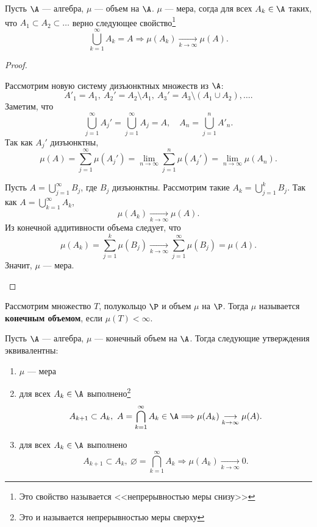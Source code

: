 \begin{thm}
    Пусть $ \A$ --- алгебра, $ \mu$ --- объем на $ \A$. $ \mu $ --- мера, согда
	для всех $ A_k \in \A$ таких, что $ A_1 \subset A_2 \subset  \ldots $ верно следующее свойство\footnote{Это свойство называется <<непрерывностью меры  снизу>>}
	\[
		\bigcup_{k=1}^{\infty} A_k = A \Longrightarrow \mu (A_k) \underset{k \to  \infty}{ \longrightarrow} \mu (A)
	.\] 
\end{thm}
\begin{proof}
    $ $
    \begin{description}
        \item {} Рассмотрим новую систему дизъюнктных множеств из $ \A$:
			 \[
				 A'_1 = A_1, ~A_2' = A_2 \setminus A_1, ~A_3' = A_3\setminus (A_1\cup A_2) , \ldots 
			.\] 
			Заметим, что
			\[
			\bigcup_{j=1}^{\infty} A_j' = \bigcup_{j=1}^{\infty} A_j = A, \quad  A_n = \bigcup_{j=1}^{n} A'_n
			.\] 
			Так как $ A_j'$ дизъюнктны, 
			\[
				\mu (A) = \sum_{j=1}^{\infty} \mu (A_j') = \lim_{n \to \infty} \sum_{j=1}^{n} \mu (A_j') = \lim_{n \to \infty} \mu (A_n)
			.\]
        \item {} 
			Пусть $ A = \bigcup\limits_{j=1}^{\infty} B_j$, где $ B_j$ дизъюнктны. Рассмотрим такие $ A_k = \bigcup\limits_{j=1}^{k} B_j$. Так как $ A =  \bigcup\limits_{k=1}^{\infty} A_k$,
			\[
				\mu (A_k) \underset{k \to  \infty}{\longrightarrow} \mu (A)
			.\] 
		Из конечной аддитивности объема следует, что
		 \[
			 \mu (A_k) = \sum_{j=1}^{k} \mu (B_j) \underset{k \to  \infty}{\longrightarrow}\sum_{j=1}^{\infty} \mu (B_j) = \mu (A)
		.\] 
		Значит, $ \mu $ --- мера.
    \end{description} 
\end{proof}
\begin{defn}
	Рассмотрим множество $ T$,  полукольцо $ \P$ и объем $ \mu $ на $ \P$. Тогда  $ \mu$ называется {\bf конечным объемом}, если  $ \mu (T) < \infty$. 
\end{defn}
\begin{thm}
	Пусть $ \A$ --- алгебра, $ \mu $ --- конечный объем на $ \A$. Тогда следующие утверждения эквивалентны:
\begin{enumerate}[label=(\roman*),noitemsep]
    \item  $ \mu $ --- мера
	\item для всех $ A_k \in \A $ выполнено\footnote{Это и называется непрерывностью меры сверху}
		\[
			A_{k+1 } \subset A_k , ~ A= \bigcap_{k=1}^{\infty} A_k \in \A \Longrightarrow \mu (A_k) \underset{k \to  \infty}{\longrightarrow} \mu (A)
		.\]  

	\item для всех $ A_k \in \A$ выполнено
		\[
			A_{k+1 } \subset A_k , ~ \varnothing= \bigcap_{k=1}^{\infty} A_k \Longrightarrow \mu (A_k) \underset{k \to  \infty}{\longrightarrow} 0
		.\] 
\end{enumerate} 
\end{thm}
